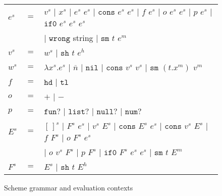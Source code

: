 \begin{figure}[p]
\centering
\begin{tabular}{lcl}

$e^s$ & $=$ & $v^s$ $\vert$ $x^s$ $\vert$ $e^s$ $e^s$ $\vert$ $\mathtt{cons}$ $e^s$ $e^s$ $\vert$ $f$ $e^s$ $\vert$ $o$ $e^s$ $e^s$ $\vert$ $p$ $e^s$ $\vert$ $\mathtt{if0}$ $e^s$ $e^s$ $e^s$ \\

&& $\vert$ $\mathtt{wrong}$ string $\vert$ $\mathtt{sm}$ $t$ $e^m$ \\

$v^s$ & $=$ & $w^s$ $\vert$ $\mathtt{sh}$ $t$ $e^h$ \\

$w^s$ & $=$ & $\lambda x^s.e^s$ $\vert$ $\overline{n}$ $\vert$ $\mathtt{nil}$ $\vert$ $\mathtt{cons}$ $v^s$ $v^s$ $\vert$ $\mathtt{sm}$ $(t.x^m)$ $v^m$ \\

$f$ & $=$ & $\mathtt{hd}$ $\vert$ $\mathtt{tl}$ \\

$o$ & $=$ & $+$ $\vert$ $-$ \\

$p$ & $=$ & $\mathtt{fun?}$ $\vert$ $\mathtt{list?}$ $\vert$ $\mathtt{null?}$ $\vert$ $\mathtt{num?}$ \\

$E^s$ & $=$ & $[\,]^s$ $\vert$ $F^s$ $e^s$ $\vert$ $v^s$ $E^s$ $\vert$ $\mathtt{cons}$ $E^s$ $e^s$ $\vert$ $\mathtt{cons}$ $v^s$ $E^s$ $\vert$ $f$ $F^s$ $\vert$ $o$ $F^s$ $e^s$ \\

&& $\vert$ $o$ $v^s$ $F^s$ $\vert$ $p$ $F^s$ $\vert$ $\mathtt{if0}$ $F^s$ $e^s$ $e^s$ $\vert$ $\mathtt{sm}$ $t$ $E^m$ \\

$F^s$ & $=$ & $E^s$ $\vert$ $\mathtt{sh}$ $t$ $E^h$

\end{tabular}
\caption{Scheme grammar and evaluation contexts}
\label{sg}
\end{figure}
